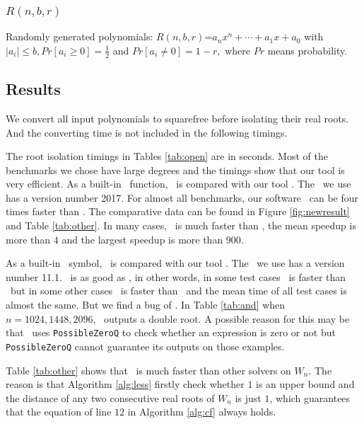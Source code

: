  \subsubsection{$R(n,b,r) $} Randomly generated polynomials: $R(n,b,r)$=$a_nx^n+\cdots+a_1x+a_0$ with $|a_i|\le b, Pr[a_i\ge 0]=\frac{1}{2}$ and  $Pr[a_i\neq 0] =1-r,$ where $Pr$ means probability.



 \subsection{Results}
We  convert all input polynomials to squarefree before isolating their real roots. And the converting time is not included in the following timings.

 The root isolation timings in Tables \ref{tab:open} are in seconds.  Most of the benchmarks we chose have large degrees and the timings show that our tool is very efficient.
As a  built-in  \MAPLE\ function, \REALROOT\ is    compared with  our tool \froot.
 	The   \MAPLE\  we use has a version number 2017.  For  almost all
 benchmarks, our  software \froot\  can be  four  times faster than \REALROOT. The comparative data can be found in Figure \ref{fig:newresult} and Table \ref{tab:other}. In many cases, \froot\ is much faster than \REALROOT, the mean speedup is more than $4$ and the largest speedup is more than $900$.


 As a  built-in \MM\ symbol, \inte\ is    compared with  our tool \froot. The  \MM\  we use has a version number 11.1. 
 	\froot\ is as good as \inte, in other words, in some test cases \froot\ is faster than \inte\ but in some other cases \inte\ is faster than \froot\ and the mean time of all test cases is  almost the same.
 	  But we find a bug of \MM. In Table \ref{tab:and} when $n=1024,1448,2096$, \inte\ outputs a double root. A possible reason for this may be that \inte\ uses {\tt PossibleZeroQ} to check whether an expression is zero or not but {\tt PossibleZeroQ} cannot guarantee its outputs on those examples.

Table \ref{tab:other} shows that \froot\ is much faster than other solvers on $W_n$. The reason is that Algorithm \ref{alg:less} firstly check whether $1$ is an upper bound and the distance of any two consecutive real roots of $W_n$ is just $1$, which guarantees that the equation of  line $12$ in Algorithm  \ref{alg:cf}  always holds.


